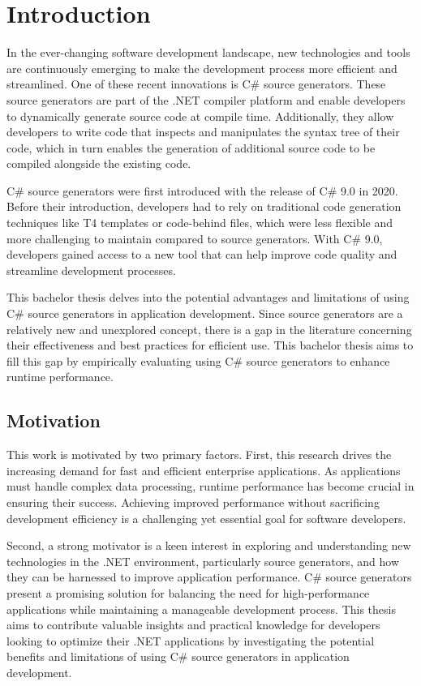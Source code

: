 \chapter{Introduction}

In the ever-changing software development landscape, new technologies and tools are continuously emerging to make the development process more efficient and streamlined. One of these recent innovations is C\# source generators. These source generators are part of the .NET compiler platform and enable developers to dynamically generate source code at compile time. Additionally, they allow developers to write code that inspects and manipulates the syntax tree of their code, which in turn enables the generation of additional source code to be compiled alongside the existing code.

C\# source generators were first introduced with the release of C\# 9.0 in 2020. Before their introduction, developers had to rely on traditional code generation techniques like T4 templates or code-behind files, which were less flexible and more challenging to maintain compared to source generators. With C\# 9.0, developers gained access to a new tool that can help improve code quality and streamline development processes.

This bachelor thesis delves into the potential advantages and limitations of using C\# source generators in application development. Since source generators are a relatively new and unexplored concept, there is a gap in the literature concerning their effectiveness and best practices for efficient use. This bachelor thesis aims to fill this gap by empirically evaluating using C\# source generators to enhance runtime performance.

\section{Motivation}

This work is motivated by two primary factors. First, this research drives the increasing demand for fast and efficient enterprise applications. As applications must handle complex data processing, runtime performance has become crucial in ensuring their success. Achieving improved performance without sacrificing development efficiency is a challenging yet essential goal for software developers.

Second, a strong motivator is a keen interest in exploring and understanding new technologies in the .NET environment, particularly source generators, and how they can be harnessed to improve application performance. C\# source generators present a promising solution for balancing the need for high-performance applications while maintaining a manageable development process. This thesis aims to contribute valuable insights and practical knowledge for developers looking to optimize their .NET applications by investigating the potential benefits and limitations of using C\# source generators in application development.

